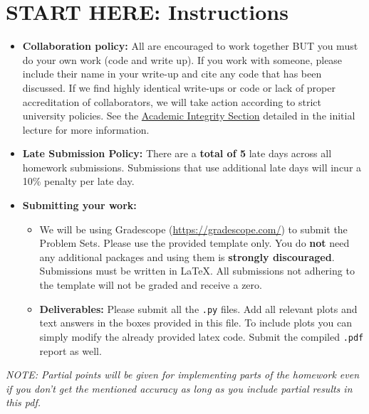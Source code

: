 \documentclass[11pt,addpoints,answers]{exam}
\numberwithin{equation}{section} %
\numberwithin{figure}{section} %
\numberwithin{table}{section} %
\begin{document}
\section*{START HERE: Instructions}
\begin{itemize}
\item \textbf{Collaboration policy:} All are encouraged to work together BUT you must do your own work (code and write up). If you work with someone, please include their name in your write-up and cite any code that has been discussed. If we find highly identical write-ups or code or lack of proper accreditation of collaborators, we will take action according to strict university policies. See the \href{hhttps://www.cmu.edu/policies/student-and-student-life/academic-integrity.html}{Academic Integrity Section} detailed in the initial lecture for more information.

\item\textbf{Late Submission Policy:} There are a \textbf{total of 5} late days across all homework submissions. Submissions that use additional late days will incur a 10\% penalty per late day.

\item\textbf{Submitting your work:}

\begin{itemize}

\item We will be using Gradescope (\url{https://gradescope.com/}) to submit the Problem Sets. Please use the provided template only. You do \textbf{not} need any additional packages and using them is \textbf{strongly discouraged}. Submissions must be written in LaTeX. All submissions not adhering to the template will not be graded and receive a zero. 
\item \textbf{Deliverables:} Please submit all the \texttt{.py} files. Add all relevant plots and text answers in the boxes provided in this file. To include plots you can simply modify the already provided latex code. Submit the compiled \texttt{.pdf} report as well.
\end{itemize}
\end{itemize}
\emph{NOTE: Partial points will be given for implementing parts of the homework even if you don't get the mentioned accuracy as long as you include partial results in this pdf.}
\clearpage
\end{document}
